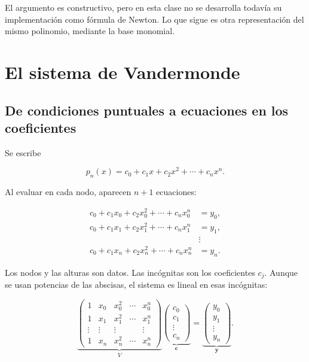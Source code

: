 \documentclass[12pt,a4paper]{article}
\begin{document}

El argumento es constructivo, pero en esta clase no se desarrolla todavía su implementación como fórmula de Newton. Lo que sigue es otra representación del mismo polinomio, mediante la base monomial.

\section{El sistema de Vandermonde}

\subsection{De condiciones puntuales a ecuaciones en los coeficientes}

Se escribe

\[
p_n(x)=c_0+c_1x+c_2x^2+\cdots+c_nx^n.
\]

Al evaluar en cada nodo, aparecen $n+1$ ecuaciones:

\[
\begin{aligned}
c_0+c_1x_0+c_2x_0^2+\cdots+c_nx_0^n&=y_0,\\
c_0+c_1x_1+c_2x_1^2+\cdots+c_nx_1^n&=y_1,\\
&\vdots\\
c_0+c_1x_n+c_2x_n^2+\cdots+c_nx_n^n&=y_n.
\end{aligned}
\]

Los nodos y las alturas son datos. Las incógnitas son los coeficientes $c_j$. Aunque se usan potencias de las abscisas, el sistema es lineal en esas incógnitas:

\[
\underbrace{\begin{pmatrix}
1&x_0&x_0^2&\cdots&x_0^n\\
1&x_1&x_1^2&\cdots&x_1^n\\
\vdots&\vdots&\vdots&&\vdots\\
1&x_n&x_n^2&\cdots&x_n^n
\end{pmatrix}}_{V}
\underbrace{\begin{pmatrix}c_0\\c_1\\\vdots\\c_n\end{pmatrix}}_{\mathbf c}
=\underbrace{\begin{pmatrix}y_0\\y_1\\\vdots\\y_n\end{pmatrix}}_{\mathbf y}.
\]
\end{document}
